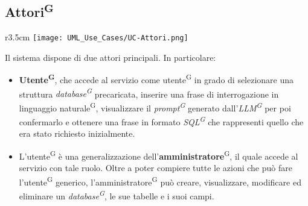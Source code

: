 \subsection{Attori\textsuperscript{G}}
\begin{wrapfigure}{r}{3.5cm}
	\texttt{[image: UML\_Use\_Cases/UC-Attori.png]}
\end{wrapfigure}
Il sistema dispone di due attori principali. In particolare:
\begin{itemize}
	\item \textbf{Utente\textsuperscript{G}}, che accede al servizio come utente\textsuperscript{G} in grado di selezionare una struttura \textit{database\textsuperscript{G}} precaricata, inserire una frase di interrogazione in linguaggio naturale\textsuperscript{G}, visualizzare il \textit{prompt\textsuperscript{G}} generato dall'\textit{LLM\textsuperscript{G}} per poi confermarlo e ottenere una frase in formato \textit{SQL\textsuperscript{G}} che rappresenti quello che era stato richiesto inizialmente.

	\item L'utente\textsuperscript{G} è una generalizzazione dell'\textbf{amministratore}\textsuperscript{G}, il quale accede al servizio con tale ruolo. Oltre a poter compiere tutte le azioni che può fare l'utente\textsuperscript{G} generico, l'amministratore\textsuperscript{G} può creare, visualizzare, modificare ed eliminare un \textit{database\textsuperscript{G}}, le sue tabelle e i suoi campi.
\end{itemize}

\setcounter{secnumdepth}{0}

